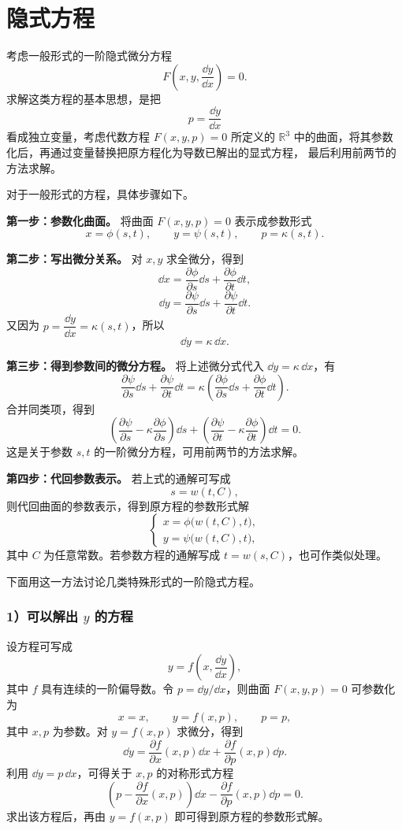 \section{隐式方程}\label{sec:隐式方程}

考虑一般形式的一阶隐式微分方程
\[
	F\left(x,y,\dfrac{\dd y}{\dd x}\right)=0.
\]
求解这类方程的基本思想，是把
\[
	p=\dfrac{\dd y}{\dd x}
\]
看成独立变量，考虑代数方程 $F(x,y,p)=0$ 所定义的 $\mathbb{R}^3$
中的曲面，将其参数化后，再通过变量替换把原方程化为导数已解出的显式方程，
最后利用前两节的方法求解。

对于一般形式的方程，具体步骤如下。

\textbf{第一步：参数化曲面。}
将曲面 $F(x,y,p)=0$ 表示成参数形式
\[
	x=\phi(s,t),\qquad
	y=\psi(s,t),\qquad
	p=\kappa(s,t).
\]

\textbf{第二步：写出微分关系。}
对 $x,y$ 求全微分，得到
\[
	\dd x=\dfrac{\partial\phi}{\partial s}\dd s
	+\dfrac{\partial\phi}{\partial t}\dd t,
\]
\[
	\dd y=\dfrac{\partial\psi}{\partial s}\dd s
	+\dfrac{\partial\psi}{\partial t}\dd t.
\]
又因为 $p=\dfrac{\dd y}{\dd x}=\kappa(s,t)$，所以
\[
	\dd y=\kappa\,\dd x.
\]

\textbf{第三步：得到参数间的微分方程。}
将上述微分式代入 $\dd y=\kappa\,\dd x$，有
\[
	\dfrac{\partial\psi}{\partial s}\dd s
	+\dfrac{\partial\psi}{\partial t}\dd t
	=
	\kappa\left(
	\dfrac{\partial\phi}{\partial s}\dd s
	+\dfrac{\partial\phi}{\partial t}\dd t
	\right).
\]
合并同类项，得到
\[
	\left(
	\dfrac{\partial\psi}{\partial s}
	-\kappa\dfrac{\partial\phi}{\partial s}
	\right)\dd s
	+
	\left(
	\dfrac{\partial\psi}{\partial t}
	-\kappa\dfrac{\partial\phi}{\partial t}
	\right)\dd t=0.
\]
这是关于参数 $s,t$ 的一阶微分方程，可用前两节的方法求解。

\textbf{第四步：代回参数表示。}
若上式的通解可写成
\[
	s=w(t,C),
\]
则代回曲面的参数表示，得到原方程的参数形式解
\[
	\begin{cases}
		x=\phi\bigl(w(t,C),t\bigr),\\
		y=\psi\bigl(w(t,C),t\bigr),
	\end{cases}
\]
其中 $C$ 为任意常数。若参数方程的通解写成 $t=w(s,C)$，也可作类似处理。

下面用这一方法讨论几类特殊形式的一阶隐式方程。

\subsubsection*{1）可以解出 \(y\) 的方程}

设方程可写成
\[
	y=f\left(x,\dfrac{\dd y}{\dd x}\right),
\]
其中 $f$ 具有连续的一阶偏导数。令 $p=\dd y/\dd x$，则曲面
$F(x,y,p)=0$ 可参数化为
\[
	x=x,\qquad y=f(x,p),\qquad p=p,
\]
其中 $x,p$ 为参数。对 $y=f(x,p)$ 求微分，得到
\[
	\dd y=\dfrac{\partial f}{\partial x}(x,p)\dd x
	+\dfrac{\partial f}{\partial p}(x,p)\dd p.
\]
利用 $\dd y=p\,\dd x$，可得关于 $x,p$ 的对称形式方程
\[
	\left(
	p-\dfrac{\partial f}{\partial x}(x,p)
	\right)\dd x
	-\dfrac{\partial f}{\partial p}(x,p)\dd p=0.
\]
求出该方程后，再由 $y=f(x,p)$ 即可得到原方程的参数形式解。

